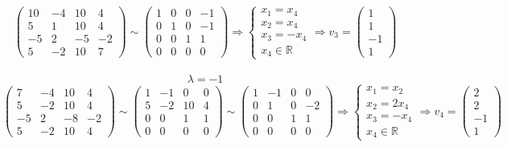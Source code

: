 \documentclass{article}
\newcommand{\la}{\lambda}
\begin{document}
$$\begin{pmatrix}
10 & -4 & 10 & 4 \\
5 & 1 & 10 & 4 \\
-5 & 2 & -5 & -2 \\
5 & -2 & 10 & 7
\end{pmatrix} \sim \begin{pmatrix}
1 & 0 & 0 & -1 \\
0 & 1 & 0 & -1 \\
0 & 0 & 1 & 1 \\
0 & 0 & 0 & 0 
\end{pmatrix} \Rightarrow \begin{cases}
x_1 = x_4 \\
x_2 = x_4 \\
x_3 = -x_4 \\
x_4 \in \mathbb{R}
\end{cases} \Rightarrow v_3 = \begin{pmatrix}1 \\ 1 \\ -1 \\ 1\end{pmatrix}$$\\
$$\la = -1$$
$$\begin{pmatrix}
7 & -4 & 10 & 4 \\
5 & -2 & 10 & 4 \\
-5 & 2 & -8 & -2 \\
5 & -2 & 10 & 4
\end{pmatrix} \sim \begin{pmatrix}
1 & -1 & 0 & 0 \\
5 & -2 & 10 & 4 \\
0 & 0 & 1 & 1 \\
0 & 0 & 0 & 0
\end{pmatrix} \sim \begin{pmatrix}
1 & -1 & 0 & 0 \\
0 & 1 & 0 & -2 \\
0 & 0 & 1 & 1 \\
0 & 0 & 0 & 0
\end{pmatrix} \Rightarrow \begin{cases}
x_1 = x_2 \\
x_2 = 2x_4 \\
x_3 = -x_4 \\
x_4 \in \mathbb{R}
\end{cases} \Rightarrow v_4 = \begin{pmatrix}2 \\ 2 \\ -1 \\ 1\end{pmatrix}$$
\end{document}

